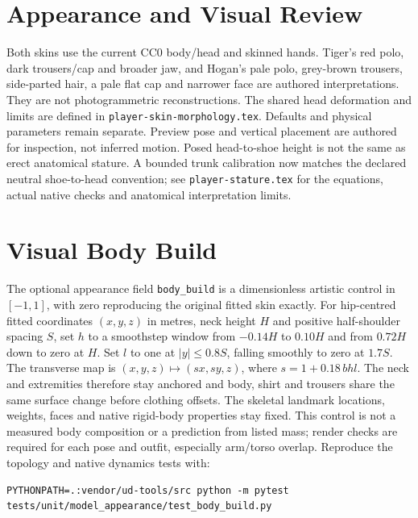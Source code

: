 \documentclass{article}
\begin{document}
\section{Appearance and Visual Review}
Both skins use the current CC0 body/head and skinned hands. Tiger's red polo,
dark trousers/cap and broader jaw, and Hogan's pale polo, grey-brown trousers,
side-parted hair, a pale flat cap and narrower face are authored interpretations. They are
not photogrammetric reconstructions. The shared head deformation and limits
are defined in \texttt{player-skin-morphology.tex}. Defaults and physical
parameters remain separate. Preview pose and vertical placement are authored
for inspection, not inferred motion. Posed head-to-shoe height is not the
same as erect anatomical stature. A bounded trunk calibration now matches
the declared neutral shoe-to-head convention; see \texttt{player-stature.tex}
for the equations, actual native checks and anatomical interpretation limits.
\section{Visual Body Build}
The optional appearance field \texttt{body\_build} is a dimensionless artistic
control in $[-1,1]$, with zero reproducing the original fitted skin exactly.
For hip-centred fitted coordinates $(x,y,z)$ in metres, neck height $H$ and
positive half-shoulder spacing $S$, set $h$ to a smoothstep window from
$-0.14H$ to $0.10H$ and from $0.72H$ down to zero at $H$. Set $l$ to one
at $|y|\le0.8S$, falling smoothly to zero at $1.7S$. The transverse map is
$(x,y,z)\mapsto(sx,sy,z)$, where $s=1+0.18\,bhl$. The neck and extremities
therefore stay anchored and body, shirt and trousers share the same surface
change before clothing offsets. The skeletal landmark locations, weights,
faces and native rigid-body properties stay fixed. This control is not a
measured body composition or a prediction from listed mass; render checks
are required for each pose and outfit, especially arm/torso overlap.
Reproduce the topology and native dynamics tests with:
\begin{verbatim}
PYTHONPATH=.:vendor/ud-tools/src python -m pytest tests/unit/model_appearance/test_body_build.py
\end{verbatim}
\end{document}
